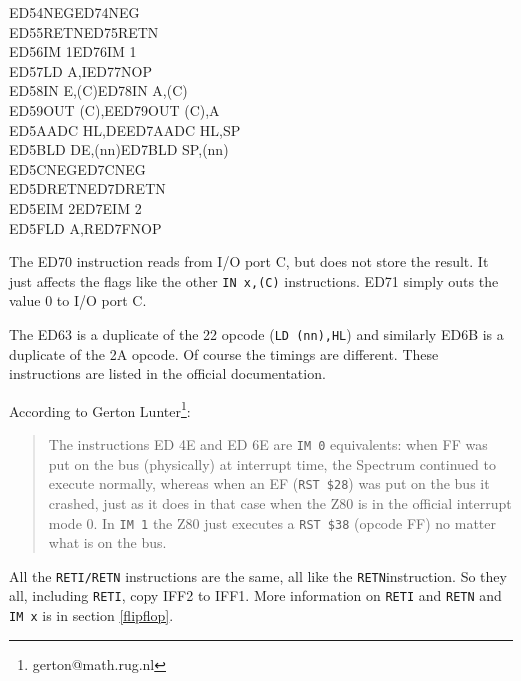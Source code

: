 \documentclass[twoside,openright,a4paper]{book}
\begin{document}
{\begin{tabbing}
		{\qquad}ED54\>NEG{\footnotemark[7]}\>ED74\>NEG{\footnotemark[7]}\\
		{\qquad}ED55\>RETN{\footnotemark[7]}\>ED75\>RETN{\footnotemark[7]}\\
		{\qquad}ED56\>IM 1\>ED76\>IM 1{\footnotemark[7]}\\
		{\qquad}ED57\>LD A,I\>ED77\>NOP{\footnotemark[7]}\\
		{\qquad}ED58\>IN E,(C)\>ED78\>IN A,(C)\\
		{\qquad}ED59\>OUT (C),E\>ED79\>OUT (C),A\\
		{\qquad}ED5A\>ADC HL,DE\>ED7A\>ADC HL,SP\\
		{\qquad}ED5B\>LD DE,(nn)\>ED7B\>LD SP,(nn)\\
		{\qquad}ED5C\>NEG{\footnotemark[7]}\>ED7C\>NEG{\footnotemark[7]}\\
		{\qquad}ED5D\>RETN{\footnotemark[7]}\>ED7D\>RETN{\footnotemark[7]}\\
		{\qquad}ED5E\>IM 2\>ED7E\>IM 2{\footnotemark[7]}\\
		{\qquad}ED5F\>LD A,R\>ED7F\>NOP{\footnotemark[7]}\\
	\end{tabbing}
}
\renewcommand{\thefootnote}{\arabic{footnote}}

The ED70 instruction reads from I/O port C, but does not store the result. It just affects the flags like the other {\tt IN x,(C)} instructions. ED71 simply outs the value 0 to I/O port C.

The ED63 is a duplicate of the 22 opcode ({\tt LD (nn),HL}) and similarly ED6B is a duplicate of the 2A opcode. Of course the timings are different. These instructions are listed in the official documentation.

According to Gerton Lunter\footnote{gerton@math.rug.nl}:

\begin{quote}
	The instructions ED 4E and ED 6E are {\tt IM 0} equivalents: when FF was put on the bus (physically) at interrupt time, the Spectrum continued to execute normally, whereas when an EF ({\tt RST \$28}) was put on the bus it crashed, just as it does in that case when the Z80 is in the official interrupt mode 0. In {\tt IM 1} the Z80 just executes a {\tt RST \$38} (opcode FF) no matter what is on the bus.
\end{quote}

All the {\tt RETI/RETN} instructions are the same, all like the {\tt RETN}instruction. So they all, including {\tt RETI}, copy IFF2 to IFF1. More information on {\tt RETI} and {\tt RETN} and {\tt IM x} is in section \ref{flipflop}.
\end{document}

